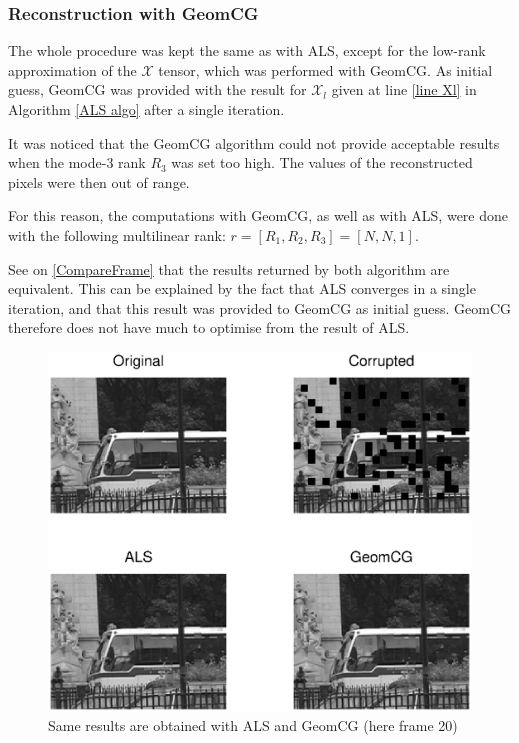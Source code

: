 \documentclass[a4paper, 11pt]{article} %
\def \X {\mathcal{X}}
\def \Xl {\mathcal{X}_{l}}
\begin{document}
\subsubsection{Reconstruction with GeomCG}

The whole procedure was kept the same as with ALS, except for the low-rank approximation of the $\X$ tensor, which was performed with GeomCG. As initial guess, GeomCG was provided with the result for $\Xl$ given at line \ref{line Xl} in Algorithm \ref{ALS algo}  after a single iteration.

It was noticed that the GeomCG algorithm could not provide acceptable results when the mode-3 rank $R_3$ was set too high. The values of the reconstructed pixels were then out of range.

For this reason, the computations with GeomCG, as well as with ALS, were done with the following multilinear rank: $r=[R_1, R_2, R_3]=[N,N,1]$. 

See on \autoref{CompareFrame} that the results returned by both algorithm are equivalent. This can be explained by the fact that ALS converges in a single iteration, and that this result was provided to GeomCG as initial guess. GeomCG therefore does not have much to optimise from the result of ALS.
\begin{figure}[h!]
\centering
\includegraphics[scale=0.6]{CompareFrame}
\caption{ Same results are obtained with ALS and GeomCG (here frame 20)\label{CompareFrame}}
\end{figure}
\end{document}
